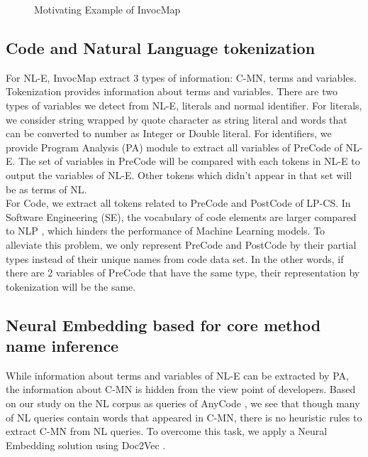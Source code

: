 \documentclass[sigconf,review,anonymous]{article}
\begin{document}
\begin{figure}
        \caption{Motivating Example of InvocMap}
        \label{figMotivatingExample} 
\end{figure}
\subsection{Code and Natural Language tokenization}
For NL-E, InvocMap extract 3 types of information: C-MN, terms and variables. Tokenization provides information about terms and variables. There are two types of variables we detect from NL-E, literals and normal identifier. For literals, we consider string wrapped by quote character as string literal and words that can be converted to number as Integer or Double literal. For identifiers, we provide Program Analysis (PA) module to extract all variables of PreCode of NL-E. The set of variables in PreCode will be compared with each tokens in NL-E to output the variables of NL-E. Other tokens which didn't appear in that set will be as terms of NL.
\\
For Code, we extract all tokens related to PreCode and PostCode of LP-CS. In  Software Engineering (SE), the vocabulary of code elements are larger compared to NLP \cite{013}, which hinders the performance of Machine Learning models. To alleviate this problem, we only represent PreCode and PostCode by their partial types instead of their unique names from code data set. In the other words, if there are 2 variables of PreCode that have the same type, their representation by tokenization will be the same.

\subsection{Neural Embedding based for core method name inference}
While information about terms and variables of NL-E can be extracted by PA, the information about C-MN is hidden from the view point of developers. Based on our study on the NL corpus as queries of AnyCode \cite{007}, we see that though many of NL queries contain words that appeared in C-MN, there is no heuristic rules to extract C-MN from NL queries. To overcome this task, we apply a Neural Embedding solution using Doc2Vec \cite{002}.
\end{document}
